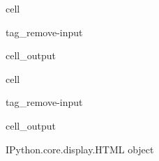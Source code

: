 \documentclass[letterpaper,10pt,english]{jupyterBook}
\begin{document}
\begin{sphinxuseclass}{cell}
\begin{sphinxuseclass}{tag_remove-input}\begin{sphinxVerbatimOutput}

\begin{sphinxuseclass}{cell_output}
\noindent{}

\end{sphinxuseclass}\end{sphinxVerbatimOutput}

\end{sphinxuseclass}
\end{sphinxuseclass}
\begin{sphinxuseclass}{cell}
\begin{sphinxuseclass}{tag_remove-input}\begin{sphinxVerbatimOutput}

\begin{sphinxuseclass}{cell_output}
\begin{sphinxVerbatim}[commandchars=\\\{\}]
\PYGZlt{}IPython.core.display.HTML object\PYGZgt{}
\end{sphinxVerbatim}

\end{sphinxuseclass}\end{sphinxVerbatimOutput}

\end{sphinxuseclass}
\end{sphinxuseclass}
\end{document}
